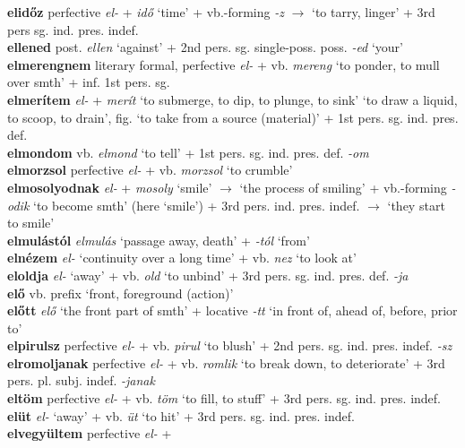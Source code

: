 \documentclass[11pt]{article}
\begin{document}
\textbf{elidőz} perfective \emph{el-} + \emph{idő} `time' +
vb.-forming \emph{-z} $\rightarrow$ `to tarry, linger' + 3rd pers
sg. ind. pres. indef. \\
\textbf{ellened} post. \emph{ellen} `against' + 2nd
pers. sg. single\hyp{}poss. poss. \emph{-ed} `your' \\
\textbf{elmerengnem} literary formal, perfective \emph{el-} + vb. \emph{mereng}
`to ponder, to mull over smth' + inf. 1st pers. sg. \\
\textbf{elmerítem} \emph{el-} + \emph{merít} `to
submerge, to dip, to plunge, to sink' \textbar\textbar{} `to draw a
liquid, to scoop, to drain', fig. `to take from a source
(material)' + 1st pers. sg. ind. pres. def. \\
\textbf{elmondom} vb. \emph{elmond} `to tell' + 1st
pers. sg. ind. pres. def. \emph{-om} \\
\textbf{elmorzsol} perfective \emph{el-} +
vb. \emph{morzsol} `to crumble' \\
\textbf{elmosolyodnak} \emph{el-}
+ \emph{mosoly} `smile' $\rightarrow$ `the process of smiling' +
vb.-forming \emph{-odik} `to become smth' (here `smile') + 3rd
pers. ind. pres. indef. $\rightarrow$ `they start to smile' \\
\textbf{elmulástól} \emph{elmulás} `passage away, death' + \emph{-tól}
`from' \\
\textbf{elnézem} \emph{el-} `continuity over a long time' +
vb. \emph{nez} `to look at' \\
\textbf{eloldja} \emph{el-} `away' + vb. \emph{old} `to
  unbind' + 3rd pers. sg. ind. pres. def. \emph{-ja} \\
\textbf{elő} vb. prefix `front, foreground (action)' \\
\textbf{előtt} \emph{elő} `the front part of smth' + locative \emph{-tt}
  `in front of, ahead of, before, prior to' \\
\textbf{elpirulsz} perfective \emph{el-} + vb. \emph{pirul}
`to blush' + 2nd pers. sg. ind. pres. indef. \emph{-sz} \\
\textbf{elromoljanak} perfective \emph{el-} +
vb. \emph{romlik} `to break down, to deteriorate' + 3rd
pers. pl. subj. indef. \emph{-janak} \\
\textbf{eltöm} perfective \emph{el-} + vb. \emph{töm} `to fill, to
stuff' + 3rd pers. sg. ind. pres. indef. \\
\textbf{elüt} \emph{el-} `away' + vb. \emph{üt} `to hit' +
3rd pers. sg. ind. pres. indef. \\
\textbf{elvegyültem} perfective \emph{el-} +
\end{document}
